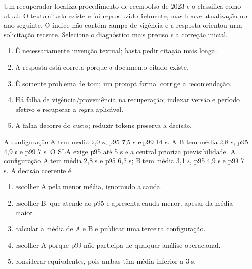 \TextoBase
Um recuperador localiza procedimento de reembolso de 2023 e o classifica como atual. O texto citado existe e foi reproduzido fielmente, mas houve atualização no ano seguinte. O índice não contém campo de vigência e a resposta orientou uma solicitação recente.
\FonteDidatica
\Comando Selecione o diagnóstico mais preciso e a correção inicial.
\begin{enumerate}[label=\Alph*)]
\item É necessariamente invenção textual; basta pedir citação mais longa.
\item A resposta está correta porque o documento citado existe.
\item É somente problema de tom; um prompt formal corrige a recomendação.
\item Há falha de vigência/proveniência na recuperação; indexar versão e período efetivo e recuperar a regra aplicável.
\item A falha decorre do custo; reduzir tokens preserva a decisão.
\end{enumerate}

\TextoBase
A configuração A tem média 2,0 s, p95 7,5 s e p99 14 s. A B tem média 2,8 s, p95 4,9 s e p99 7 s. O SLA exige p95 até 5 s e a central prioriza previsibilidade.
A configuração A tem média 2,8 s e p95 6,3 s; B tem média 3,1 s, p95 4,9 s e p99 7 s.
\FonteDidatica
\Comando A decisão coerente é
\begin{enumerate}[label=\Alph*)]
\item escolher A pela menor média, ignorando a cauda.
\item escolher B, que atende ao p95 e apresenta cauda menor, apesar da média maior.
\item calcular a média de A e B e publicar uma terceira configuração.
\item escolher A porque p99 não participa de qualquer análise operacional.
\item considerar equivalentes, pois ambas têm média inferior a 3 s.
\end{enumerate}

